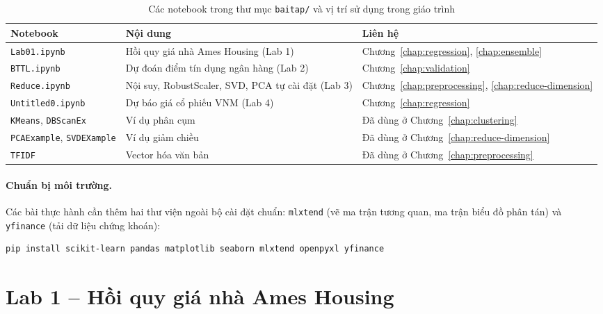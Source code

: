 \begin{table}[H]
\centering
\begin{tabular}{|l|p{6.2cm}|p{4.2cm}|}
\hline
\textbf{Notebook} & \textbf{Nội dung} & \textbf{Liên hệ} \\
\hline
\texttt{Lab01.ipynb} & Hồi quy giá nhà Ames Housing (Lab 1) & Chương~\ref{chap:regression}, \ref{chap:ensemble} \\ \hline
\texttt{BTTL.ipynb} & Dự đoán điểm tín dụng ngân hàng (Lab 2) & Chương~\ref{chap:validation} \\ \hline
\texttt{Reduce.ipynb} & Nội suy, RobustScaler, SVD, PCA tự cài đặt (Lab 3) & Chương~\ref{chap:preprocessing}, \ref{chap:reduce-dimension} \\ \hline
\texttt{Untitled0.ipynb} & Dự báo giá cổ phiếu VNM (Lab 4) & Chương~\ref{chap:regression} \\ \hline
\texttt{KMeans}, \texttt{DBScanEx} & Ví dụ phân cụm & Đã dùng ở Chương~\ref{chap:clustering} \\ \hline
\texttt{PCAExample}, \texttt{SVDEXample} & Ví dụ giảm chiều & Đã dùng ở Chương~\ref{chap:reduce-dimension} \\ \hline
\texttt{TFIDF} & Vector hóa văn bản & Đã dùng ở Chương~\ref{chap:preprocessing} \\ \hline
\end{tabular}
\caption{Các notebook trong thư mục \texttt{baitap/} và vị trí sử dụng trong giáo trình}
\end{table}

\paragraph{Chuẩn bị môi trường.} Các bài thực hành cần thêm hai thư viện ngoài bộ cài đặt chuẩn: \texttt{mlxtend} (vẽ ma trận tương quan, ma trận biểu đồ phân tán) và \texttt{yfinance} (tải dữ liệu chứng khoán):
\begin{lstlisting}[language=bash, caption={Cài đặt thư viện cho các bài thực hành}]
pip install scikit-learn pandas matplotlib seaborn mlxtend openpyxl yfinance
\end{lstlisting}

\section{Lab 1 -- Hồi quy giá nhà Ames Housing}
\label{sec:lab-ames}

